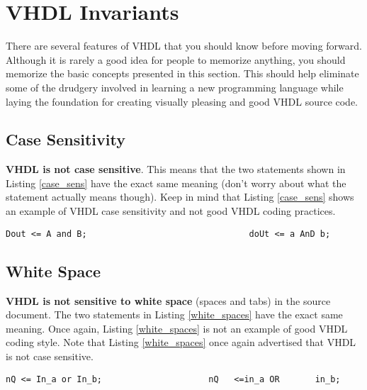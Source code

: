 %
%
%
\chapter{VHDL Invariants}
There are several features of VHDL that you should know before moving forward. Although it is rarely a good idea for people to memorize anything, you should memorize the basic concepts presented in this section. This should help eliminate some of the drudgery involved in learning a new programming language while laying the foundation for creating visually pleasing and good VHDL source code.

\section{Case Sensitivity}
\textbf{VHDL is not case sensitive}. This means that the two statements shown in Listing \ref{case_sens} have the exact same meaning (don't worry about what the statement actually means though). Keep in mind that Listing \ref{case_sens} shows an example of VHDL case sensitivity and not good VHDL coding practices.
\begin{lstlisting}[label=case_sens, caption=An example of VHDL case insensitivity.]
Dout <= A and B;								doUt <= a AnD b;
\end{lstlisting}
\section{White Space}
\textbf{VHDL is not sensitive to white space} (spaces and tabs) in the source document. The two statements in Listing \ref{white_spaces} have the exact same meaning. Once again, Listing \ref{white_spaces} is not an example of good VHDL coding style. Note that Listing \ref{white_spaces} once again advertised that VHDL is not case sensitive.
\begin{lstlisting}[label=white_spaces, caption=An example showing VHDL's indifference to white space.]
nQ <= In_a or In_b;						nQ   <=in_a OR       in_b;
\end{lstlisting}

